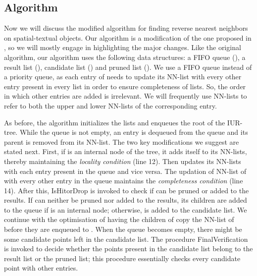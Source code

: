 \documentclass[prodmode,letterpaper]{acmsmall}
\begin{document}
\subsection{Algorithm}
Now we will discuss the modified algorithm for finding reverse nearest neighbors on
spatial-textual objects. Our algorithm is a modification of the one proposed in
\cite{lu2011reverse}, so we will mostly engage in highlighting the major changes.
Like the original algorithm, our algorithm uses the following data structures: a FIFO queue (), a result
list (), candidate list () and pruned list (). We use a FIFO
queue instead of a priority queue, as each entry of needs to update its
NN-list with every other entry present in every list  in order to
ensure completeness of lists. So, the order in which other entries are added is
irrelevant. We will frequently use NN-lists to refer to both the upper and lower
NN-lists of the corresponding entry.

As before, the algorithm initializes the lists and enqueues the root of the IUR-tree.
While the queue is not empty, an entry  is dequeued from the queue and its
parent is removed from its NN-list. The two key modifications we suggest are
stated next. First, if  is an internal node of the tree, it
adds itself to its NN-lists, thereby maintaining the {\em locality condition}
(line 12).
Then  updates its NN-lists with each entry  present in the queue and vice
versa. The updation of NN-list of  with every other entry in the queue
maintains the {\em completeness condition} (line 14). After this, IsHitorDrop is invoked to check if  can
be pruned or added to the results. If  can neither be pruned nor added to the
results, its children are added to the queue if  is an internal node;
otherwise,  is added to the candidate list. We continue with the optimisation
of having the children of  copy the NN-list of  before they are enqueued to .
When the queue
becomes empty, there might be some candidate points left in the candidate list.
The procedure FinalVerification is invoked to decide whether the points
present in the candidate list belong to the result list or the pruned list; this
procedure essentially checks every candidate point with other entries.
\end{document}
